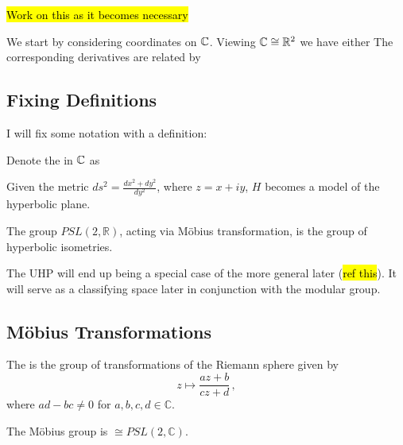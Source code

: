 \documentclass{article}
\begin{document}
\hl{Work on this as it becomes necessary}

We start by considering coordinates on $\mathbb{C}$. Viewing $\mathbb{C}\cong \mathbb{R}^2$ we have either 
The corresponding derivatives are related by 
\subsection{Fixing Definitions}
I will fix some notation with a definition:
\begin{definition}\label{def: UHP}
	Denote the  in $\mathbb{C}$ as 
\end{definition}

\begin{prop}
	Given the metric $ds^2 = \frac{dx^2+dy^2}{dy^2}$, where $z=x+iy$, $H$ becomes a model of the hyperbolic plane.  
\end{prop}

\begin{prop}
	The group $PSL(2, \mathbb{R})$, acting via M\"obius transformation, is the group of hyperbolic isometries. 
\end{prop}

The UHP will end up being a special case of the more general  later (\hl{ref this}). It will serve as a classifying space later in conjunction with the modular group. 
\subsection{M\"obius Transformations}
\begin{definition}
The  is the group of transformations of the Riemann sphere given by 
\[
z \mapsto \frac{az+b}{cz+d} \, ,
\]
where $ad-bc \neq 0$ for $a,b,c,d \in \mathbb{C}$.
\end{definition}
\begin{lemma}
	The M\"obius group is $\cong PSL(2, \mathbb{C})$. 
\end{lemma}
\end{document}
